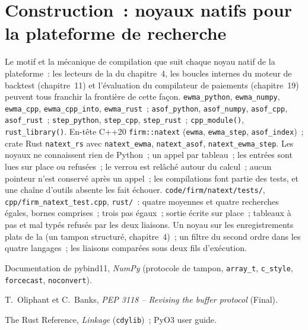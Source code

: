 \section{Construction~: noyaux natifs pour la plateforme de recherche}\label{bld:pl:native-extensions:natext}

\begin{build}
 Le motif et la mécanique de compilation que suit chaque noyau natif de la plateforme~: les lecteurs de la  du
chapitre~4, les boucles internes du moteur de backtest (chapitre~11) et l'évaluation du compilateur de paiements (chapitre~19) peuvent
tous franchir la frontière de cette façon.
 \texttt{ewma\_python}, \texttt{ewma\_numpy}, \texttt{ewma\_cpp}, \texttt{ewma\_cpp\_into}, \texttt{ewma\_rust}~;
\texttt{asof\_python}, \texttt{asof\_numpy}, \texttt{asof\_cpp}, \texttt{asof\_rust}~; \texttt{step\_python}, \texttt{step\_cpp},
\texttt{step\_rust}~; \texttt{cpp\_module()}, \texttt{rust\_library()}. En-tête C++20 \texttt{firm::natext} (\texttt{ewma},
\texttt{ewma\_step}, \texttt{asof\_index})~; crate Rust \texttt{natext\_rs} avec \texttt{natext\_ewma}, \texttt{natext\_asof},
\texttt{natext\_ewma\_step}.
 Les noyaux ne connaissent rien de Python~; un appel par tableau~; les entrées sont lues sur place ou refusées~; le verrou
est relâché autour du calcul~; aucun pointeur n'est conservé après un appel~; les compilations font partie des tests, et une chaîne d'outils absente les fait échouer.
 \texttt{code/firm/natext/tests/}, \texttt{cpp/firm\_natext\_test.cpp}, \texttt{rust/}~: quatre moyennes et quatre
recherches égales, bornes comprises~; trois pas égaux~; sortie écrite sur place~; tableaux à pas et mal typés refusés par les deux liaisons.
 Un noyau sur les enregistrements plats de la  (un tampon structuré, chapitre~4)~; un filtre du
second ordre dans les quatre langages~; les liaisons comparées sous deux fils d'exécution.
\end{build}

\begin{omsources}
\item Documentation de pybind11, \emph{NumPy} (protocole de tampon, \texttt{array\_t}, \texttt{c\_style}, \texttt{forcecast},
\texttt{noconvert}).
\item T.~Oliphant et C.~Banks, \emph{PEP 3118 -- Revising the buffer protocol} (Final).
\item The Rust Reference, \emph{Linkage} (\texttt{cdylib})~; PyO3 user guide.
\end{omsources}

